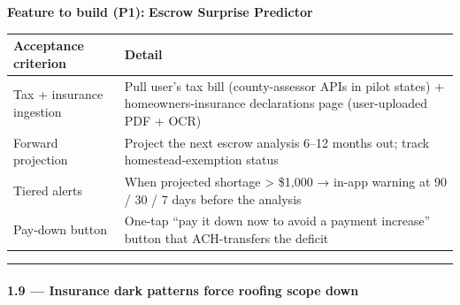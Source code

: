 \documentclass[
  10pt,
]{article}
\begin{document}
\textbf{Feature to build (P1):} \textbf{Escrow Surprise Predictor}

\begin{longtable}[]{@{}ll@{}}
\toprule
\begin{minipage}[b]{0.47\columnwidth}\raggedright
Acceptance criterion\strut
\end{minipage} & \begin{minipage}[b]{0.47\columnwidth}\raggedright
Detail\strut
\end{minipage}\tabularnewline
\midrule
\endhead
\begin{minipage}[t]{0.47\columnwidth}\raggedright
Tax + insurance ingestion\strut
\end{minipage} & \begin{minipage}[t]{0.47\columnwidth}\raggedright
Pull user's tax bill (county-assessor APIs in pilot states) + homeowners-insurance declarations page
(user-uploaded PDF + OCR)\strut
\end{minipage}\tabularnewline
\begin{minipage}[t]{0.47\columnwidth}\raggedright
Forward projection\strut
\end{minipage} & \begin{minipage}[t]{0.47\columnwidth}\raggedright
Project the next escrow analysis 6--12 months out; track homestead-exemption status\strut
\end{minipage}\tabularnewline
\begin{minipage}[t]{0.47\columnwidth}\raggedright
Tiered alerts\strut
\end{minipage} & \begin{minipage}[t]{0.47\columnwidth}\raggedright
When projected shortage \textgreater{} \$1,000 → in-app warning at 90 / 30 / 7 days before the
analysis\strut
\end{minipage}\tabularnewline
\begin{minipage}[t]{0.47\columnwidth}\raggedright
Pay-down button\strut
\end{minipage} & \begin{minipage}[t]{0.47\columnwidth}\raggedright
One-tap ``pay it down now to avoid a payment increase'' button that ACH-transfers the deficit\strut
\end{minipage}\tabularnewline
\bottomrule
\end{longtable}

\begin{center}\rule{0.5\linewidth}{0.5pt}\end{center}

\hypertarget{insurance-dark-patterns-force-roofing-scope-down}{%
\paragraph{1.9 --- Insurance dark patterns force roofing scope
down}\label{insurance-dark-patterns-force-roofing-scope-down}}
\end{document}
